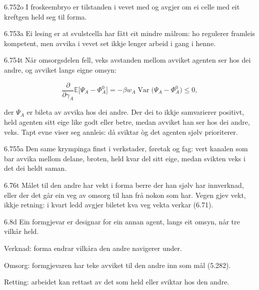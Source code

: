 \begin{formproposition}{6.752}{o}
I froskeembryo er tilstanden i vevet med og avgjer om ei celle med eit kreftgen held seg til forma.
\end{formproposition}

\begin{formproposition}{6.753}{a}
Ei lesing er at svulstcella har fått eit mindre målrom: ho regulerer framleis kompetent, men avvika i vevet set ikkje lenger arbeid i gang i henne.
\end{formproposition}

\begin{formproposition}{6.754}{t}
Når omsorgsdelen fell, veks avstanden mellom avviket agenten ser hos dei andre, og avviket langs eigne omsyn:

\[
\frac{\partial}{\partial\gamma_A}\mathbb E\bigl[\Psi_A-\Phi^0_A\bigr]=-\beta w_A\operatorname{Var}\bigl(\Psi_A-\Phi^0_A\bigr)\leq0,
\]

der \(\Psi_A\) er bileta av avvika hos dei andre. Der dei to ikkje samvarierer positivt, held agenten sitt eige like godt eller betre, medan avviket han ser hos dei andre, veks. Tapt evne viser seg annleis: då sviktar òg det agenten sjølv prioriterer.
\end{formproposition}

\begin{formproposition}{6.755}{a}
Den same krympinga finst i verkstader, føretak og fag: vert kanalen som bar avvika mellom delane, broten, held kvar del sitt eige, medan svikten veks i det dei heldt saman.
\end{formproposition}

\begin{formproposition}{6.76}{t}
Målet til den andre har vekt i forma berre der han sjølv har innverknad, eller der det går ein veg av omsorg til han frå nokon som har. Vegen gjev vekt, ikkje retning: i kvart ledd avgjer biletet kva veg vekta verkar (6.71).
\end{formproposition}

\begin{formproposition}{6.8}{d}
Ein formgjevar er designar for ein annan agent, langs eit omsyn, når tre vilkår held.

Verknad: forma endrar vilkåra den andre navigerer under.

Omsorg: formgjevaren har teke avviket til den andre inn som mål (5.282).

Retting: arbeidet kan rettast av det som held eller sviktar hos den andre.
\end{formproposition}

